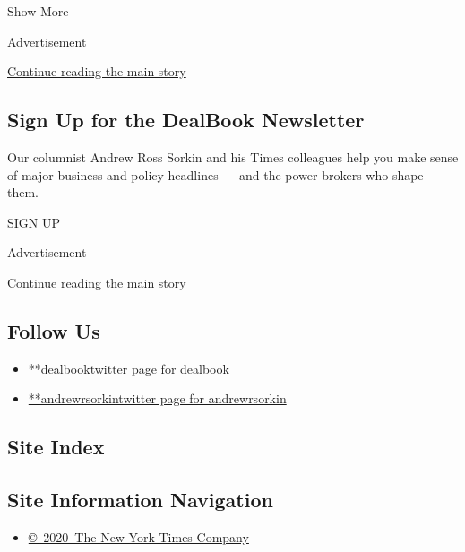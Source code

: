 Show More

Advertisement

\protect\hyperlink{after-mid2}{Continue reading the main story}

\hypertarget{sign-up-for-the-dealbook-newsletter}{%
\subsection{Sign Up for the DealBook
Newsletter}\label{sign-up-for-the-dealbook-newsletter}}

Our columnist Andrew Ross Sorkin and his Times colleagues help you make
sense of major business and policy headlines --- and the power-brokers
who shape them.

\href{/newsletters/signup/DK}{SIGN UP}

Advertisement

\protect\hyperlink{after-mktg}{Continue reading the main story}

\hypertarget{follow-us}{%
\subsection{Follow Us}\label{follow-us}}

\begin{itemize}
\tightlist
\item
  \href{https://twitter.com/dealbook}{**dealbooktwitter page for
  dealbook}
\item
  \href{https://twitter.com/andrewrsorkin}{**andrewrsorkintwitter page
  for andrewrsorkin}
\end{itemize}

\hypertarget{site-index}{%
\subsection{Site Index}\label{site-index}}

\hypertarget{site-information-navigation}{%
\subsection{Site Information
Navigation}\label{site-information-navigation}}

\begin{itemize}
\tightlist
\item
  \href{https://help.nytimes3xbfgragh.onion/hc/en-us/articles/115014792127-Copyright-notice}{©~2020~The
  New York Times Company}
\end{itemize}

